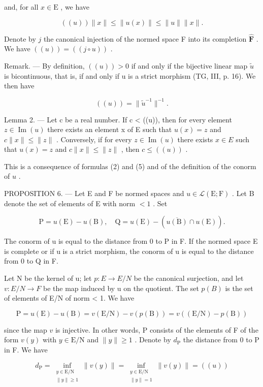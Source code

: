 and, for all \(x \in \mathrm{E}\) , we have

\[
((u)) \| x \| \leqslant \| u (x) \| \leqslant \| u \| \| x \|.\tag{9}
\]

Denote by \(j\) the canonical injection of the normed space F into its completion \(\widehat{\mathbf{F}}\) . We have \(((u)) = ((j \circ u))\) .

Remark. --- By definition, \(((u)) > 0\) if and only if the bijective linear map \(\widetilde{u}\) is bicontinuous, that is, if and only if u is a strict morphism (TG, III, p. 16). We then have

\[
((u)) = \| \widetilde {u} ^ {- 1} \| ^ {- 1}.\tag{10}
\]

Lemma 2. --- Let c be a real number. If c \textless{} ((u)), then for every element \(z \in \operatorname{Im}(u)\) there exists an element x of E such that \(u(x) = z\) and \(c \|x\| \leqslant \|z\|\) . Conversely, if for every \(z \in \operatorname{Im}(u)\) there exists \(x \in E\) such that \(u(x) = z\) and \(c \|x\| \leqslant \|z\|\) , then \(c \leqslant ((u))\) .

This is a consequence of formulas (2) and (5) and of the definition of the conorm of \(u\) .

PROPOSITION 6. --- Let E and F be normed spaces and \(u \in \mathcal{L}(\mathrm{E};\mathrm{F})\) . Let B denote the set of elements of E with norm \(< 1\) . Set

\[
\mathrm{P} = u (\mathrm{E}) - u (\mathrm{B}), \quad \mathrm{Q} = u (\mathrm{E}) - (\overline {{u (\mathrm{B})}} \cap u (\mathrm{E})).
\]

The conorm of u is equal to the distance from 0 to P in F. If the normed space E is complete or if u is a strict morphism, the conorm of u is equal to the distance from 0 to Q in F.

Let N be the kernel of u; let \(p: E \to E/N\) be the canonical surjection, and let \(v: E/N \to F\) be the map induced by u on the quotient. The set \(p(B)\) is the set of elements of E/N of norm \textless{} 1. We have

\[
\mathrm{P} = u (\mathrm{E}) - u (\mathrm{B}) = v (\mathrm{E} / \mathrm{N}) - v (p (\mathrm{B})) = v ((\mathrm{E} / \mathrm{N}) - p (\mathrm{B}))
\]

since the map \(v\) is injective. In other words, P consists of the elements of F of the form \(v(y)\) with \(y \in \mathrm{E/N}\) and \(\|y\| \geqslant 1\) . Denote by \(d_{\mathrm{P}}\) the distance from 0 to P in F. We have

\[
d_{\mathrm{P}} = \inf_{\substack{y\in \mathrm{E} / \mathrm{N}\\ \| y\| \geqslant 1}}\| v(y)\| = \inf_{\substack{y\in \mathrm{E} / \mathrm{N}\\ \| y\| = 1}}\| v(y)\| = ((u))
\]

